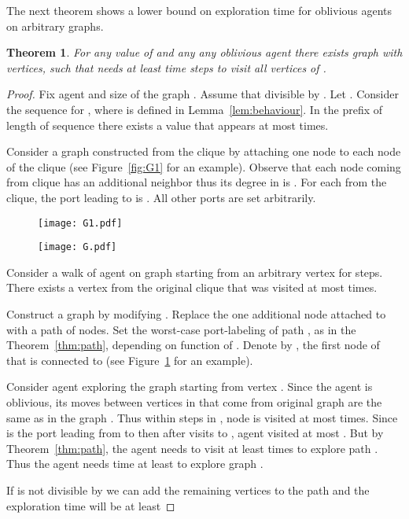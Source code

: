 \documentclass{article}[11pt,letter]
\newtheorem{theorem}[definition]{Theorem}
\newtheorem{theorem}[definition]{Theorem}
\begin{document}
The next theorem shows a lower bound on exploration time for oblivious agents on arbitrary graphs.
\begin{theorem}
\label{thm:lower_general}
For any value of  and any any oblivious agent  there exists graph  with  vertices, such that  needs at least  time steps to visit all vertices of .
\end{theorem}
\begin{proof}
Fix agent  and size of the graph . Assume that  divisible by . 
Let . Consider the sequence  for , where  is defined in Lemma~\ref{lem:behaviour}. In the prefix of length  of sequence  there exists a value  that appears at most  times. 

Consider a graph  constructed from the clique  by attaching one node  to each node  of the clique (see Figure~\ref{fig:G1} for an example). Observe that each node coming from clique  has an additional neighbor thus its degree in  is . For each  from the clique, the port leading to  is . All other ports are set arbitrarily.

\begin{figure}[ht]
\centering
\begin{minipage}{.5\textwidth}
  \centering
  \texttt{[image: G1.pdf]}
  \label{fig:G1}
\end{minipage}\begin{minipage}{.5\textwidth}
  \centering
  \texttt{[image: G.pdf]}
  \label{fig:G}
\end{minipage}
\end{figure}

Consider a walk of agent  on graph  starting from an arbitrary vertex  for  steps. There exists a vertex  from the original clique  that was visited at most  times. 

Construct a graph  by modifying . Replace the one additional node attached to  with a path  of  nodes. Set the worst-case port-labeling of path , as in the Theorem~\ref{thm:path}, depending on function  of . Denote by , the first node of  that is connected to  (see Figure~\ref{fig:G} for an example).


Consider agent  exploring the graph  starting from vertex . Since the agent is oblivious, its moves between vertices in  that come from original graph  are the same as in the graph . Thus within  steps in , node  is visited at most  times. Since  is the port leading from  to  then after  visits to , agent visited  at most .
But by Theorem~\ref{thm:path}, the agent needs to visit  at least  times to explore path . Thus the agent needs time at least  to explore graph .

If  is not divisible by  we can add the remaining vertices to the path and the exploration time will be at least 
\end{proof}
\end{document}
